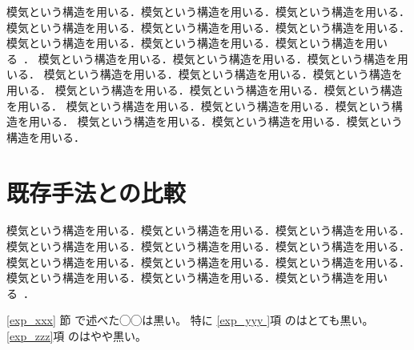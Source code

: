 模気という構造を用いる．模気という構造を用いる．模気という構造を用いる．
模気という構造を用いる．模気という構造を用いる．模気という構造を用いる．
模気という構造を用いる．模気という構造を用いる．模気という構造を用いる~\cite{sasada2005yarv}．
模気という構造を用いる．模気という構造を用いる．模気という構造を用いる．
模気という構造を用いる．模気という構造を用いる．模気という構造を用いる．
模気という構造を用いる．模気という構造を用いる．模気という構造を用いる．
模気という構造を用いる．模気という構造を用いる．模気という構造を用いる．
模気という構造を用いる．模気という構造を用いる．模気という構造を用いる．

\section{既存手法との比較}
\label{subsec:exp_zzz}

模気という構造を用いる．模気という構造を用いる．模気という構造を用いる．
模気という構造を用いる．模気という構造を用いる．模気という構造を用いる．
模気という構造を用いる．模気という構造を用いる．模気という構造を用いる．
模気という構造を用いる．模気という構造を用いる．模気という構造を用いる~\cite{richardson2008restful}．

\ref{exp_xxx} 節 で述べた◯◯は黒い。
特に \ref{exp_yyy }項 のはとても黒い。
\ref{exp_zzz}項 のはやや黒い。
